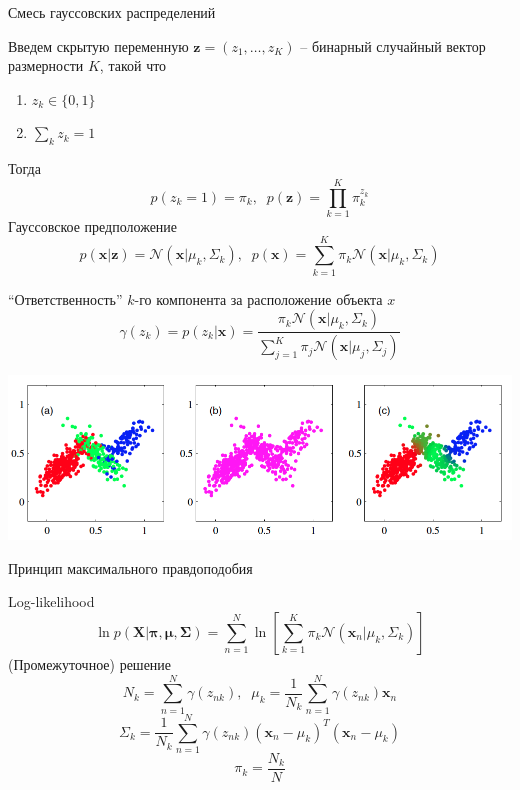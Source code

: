 \documentclass[10pt,a4paper]{beamer}
\begin{document}

\begin{frame}{Смесь гауссовских распределений}

Введем скрытую переменную $\mathbf{z} = (z_1, \ldots, z_K)$ -- бинарный случайный вектор размерности $K$, такой что
\begin{enumerate}
\item $z_k \in \{0, 1\}$
\item $\sum_k z_k = 1$
\end{enumerate}
Тогда
\[
p(z_k = 1) = \pi_k, \;\; p(\mathbf{z}) = \prod_{k=1}^K \pi_k^{z_k}
\]
Гауссовское предположение
\[
p(\mathbf{x} | \mathbf{z}) = \mathcal{N} (\mathbf{x} | \mu_k, \Sigma_k), \;\; p(\mathbf{x}) = \sum_{k=1}^K \pi_k \mathcal{N} (\mathbf{x} | \mu_k, \Sigma_k)
\]

\end{frame}


\begin{frame}{}

``Ответственность'' $k$-го компонента за расположение объекта $x$
\[
\gamma(z_k) = p(z_k | \mathbf{x}) = \frac{\pi_k \mathcal{N} (\mathbf{x} | \mu_k, \Sigma_k)}{\sum_{j=1}^K \pi_j \mathcal{N} (\mathbf{x} | \mu_j, \Sigma_j)}
\]

\begin{center}
\includegraphics[scale=0.3]{images/gamma.png}
\end{center}

\end{frame}


\begin{frame}{Принцип максимального правдоподобия}

Log-likelihood
\[
\ln p(\mathbf{X} | \mathbf{\pi}, \mathbf{\mu}, \mathbf{\Sigma}) = \sum_{n=1}^N \ln \left[ \sum_{k=1}^K \pi_k \mathcal{N} (\mathbf{x}_n | \mu_k, \Sigma_k) \right]
\]
(Промежуточное) решение
\[
N_k = \sum_{n=1}^N \gamma(z_{nk}), \;\; \mu_k = \frac 1 {N_k} \sum_{n=1}^N \gamma(z_{nk}) \mathbf{x}_n
\]
\[
\Sigma_k = \frac 1 {N_k} \sum_{n=1}^N \gamma(z_{nk}) (\mathbf{x}_n - \mu_k)^T (\mathbf{x}_n - \mu_k)
\]
\[
\pi_k = \frac{N_k}{N}
\]

\end{frame}
\end{document}
